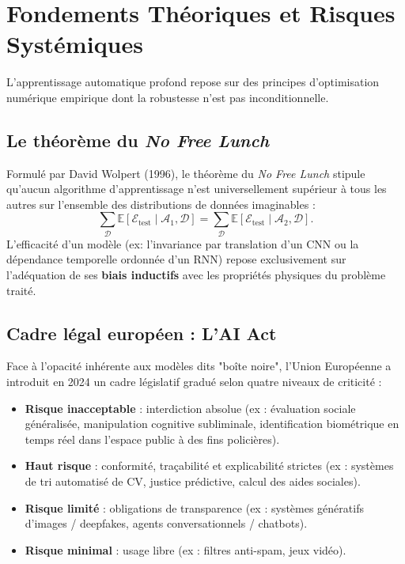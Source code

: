 \minitoc


\section{Fondements Théoriques et Risques Systémiques}

L'apprentissage automatique profond repose sur des principes d'optimisation numérique empirique dont la robustesse n'est pas inconditionnelle.

\subsection{Le théorème du \emph{No Free Lunch}}

Formulé par David Wolpert (1996), le théorème du \emph{No Free Lunch} stipule qu'aucun algorithme d'apprentissage n'est universellement supérieur à tous les autres sur l'ensemble des distributions de données imaginables :
\begin{equation}
    \sum_{\mathcal{D}} \mathbb{E}\left[\mathcal{E}_{\mathrm{test}} \mid \mathcal{A}_1, \mathcal{D}\right] = \sum_{\mathcal{D}} \mathbb{E}\left[\mathcal{E}_{\mathrm{test}} \mid \mathcal{A}_2, \mathcal{D}\right].
\end{equation}
L'efficacité d'un modèle (ex: l'invariance par translation d'un CNN ou la dépendance temporelle ordonnée d'un RNN) repose exclusivement sur l'adéquation de ses \textbf{biais inductifs} avec les propriétés physiques du problème traité.

\subsection{Cadre légal européen : L'AI Act}

Face à l'opacité inhérente aux modèles dits "boîte noire", l'Union Européenne a introduit en 2024 un cadre législatif gradué selon quatre niveaux de criticité :
\begin{itemize}
    \item \textbf{Risque inacceptable} : interdiction absolue (ex : évaluation sociale généralisée, manipulation cognitive subliminale, identification biométrique en temps réel dans l'espace public à des fins policières).
    \item \textbf{Haut risque} : conformité, traçabilité et explicabilité strictes (ex : systèmes de tri automatisé de CV, justice prédictive, calcul des aides sociales).
    \item \textbf{Risque limité} : obligations de transparence (ex : systèmes génératifs d'images / deepfakes, agents conversationnels / chatbots).
    \item \textbf{Risque minimal} : usage libre (ex : filtres anti-spam, jeux vidéo).
\end{itemize}

